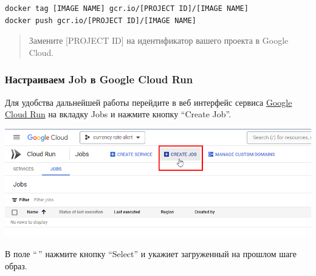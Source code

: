 \documentclass[
]{book}
\begin{document}
\begin{verbatim}
docker tag [IMAGE NAME] gcr.io/[PROJECT ID]/[IMAGE NAME]
docker push gcr.io/[PROJECT ID]/[IMAGE NAME]
\end{verbatim}

\begin{quote}
Замените {[}PROJECT ID{]} на идентификатор вашего проекта в Google Cloud.
\end{quote}

\subsubsection{Настраиваем Job в Google Cloud Run}\label{ux43dux430ux441ux442ux440ux430ux438ux432ux430ux435ux43c-job-ux432-google-cloud-run}

Для удобства дальнейшей работы перейдите в веб интерфейс сервиса \href{https://console.cloud.google.com/run/jobs}{Google Cloud Run} на вкладку Jobs и нажмите кнопку ``Create Job''.

\includegraphics{img/9-3.png}

В поле ``\,'' нажмите кнопку ``Select'' и укажиет загруженный на прошлом шаге образ.
\end{document}
